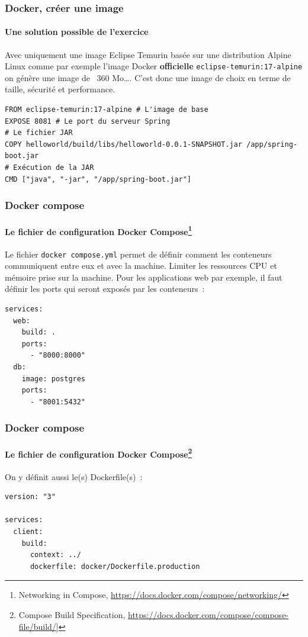 \documentclass{beamer}
\begin{document}
    \begin{frame}[fragile]
        \transdissolve
        \frametitle{Docker, créer une image}
        \framesubtitle{Une solution possible de l'exercice}
        Avec uniquement une image Eclipse Temurin basée sur une distribution Alpine Linux comme par exemple l'image Docker \textbf{officielle} \lstinline{eclipse-temurin:17-alpine} on génère une image de  ~360 Mo\ldots.
        \bigbreak
        \bigbreak
        C'est donc une image de choix en terme de taille, sécurité et performance.
        \begin{lstlisting}
FROM eclipse-temurin:17-alpine # L'image de base
EXPOSE 8081 # Le port du serveur Spring
# Le fichier JAR
COPY helloworld/build/libs/helloworld-0.0.1-SNAPSHOT.jar /app/spring-boot.jar
# Exécution de la JAR
CMD ["java", "-jar", "/app/spring-boot.jar"]
        \end{lstlisting}
    \end{frame}

    \begin{frame}[fragile]
        \transdissolve
        \frametitle{Docker compose}
        \framesubtitle{Le fichier de configuration Docker Compose\footnote{Networking in Compose, \url{https://docs.docker.com/compose/networking/}}}
        Le fichier \lstinline{docker compose.yml} permet de définir comment les conteneurs communiquent entre eux et avec la machine.
        Limiter les ressources CPU et mémoire prise sur la machine.
        \bigbreak
        Pour les applications web par exemple, il faut définir les ports qui seront exposés par les conteneurs~:
        \begin{lstlisting}
services:
  web:
    build: .
    ports:
      - "8000:8000"
  db:
    image: postgres
    ports:
      - "8001:5432"
        \end{lstlisting}
    \end{frame}

    \begin{frame}[fragile]
        \transdissolve
        \frametitle{Docker compose}
        \framesubtitle{Le fichier de configuration Docker Compose\footnote{Compose Build Specification, \url{https://docs.docker.com/compose/compose-file/build/}]}}
        On y définit aussi le(s) Dockerfile(s)~:
        \begin{lstlisting}
version: "3"

services:
  client:
    build:
      context: ../
      dockerfile: docker/Dockerfile.production
        \end{lstlisting}
    \end{frame}
\end{document}
